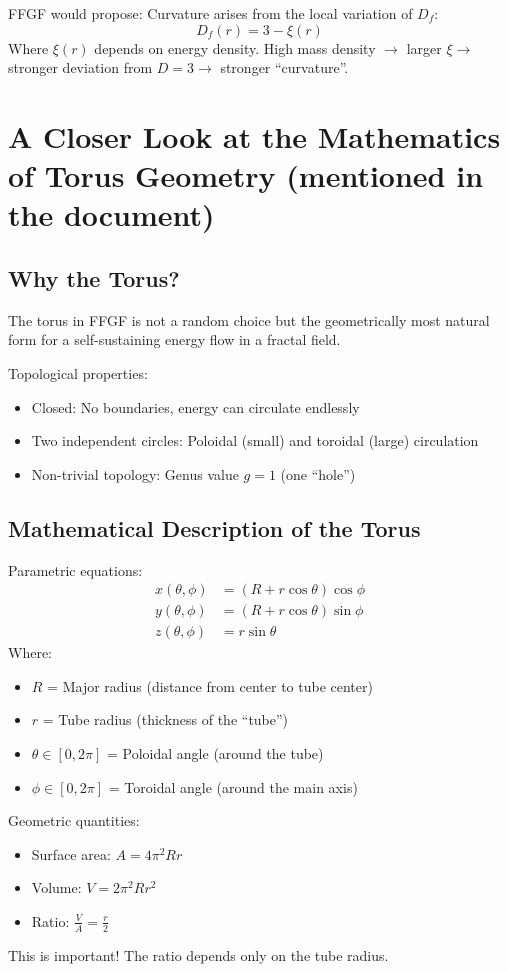 	FFGF would propose: Curvature arises from the local variation of \( D_f \):
	\[
	D_f(r) = 3 - \xi(r)
	\]
	Where \( \xi(r) \) depends on energy density. High mass density \( \rightarrow \) larger \( \xi \rightarrow \) stronger deviation from \( D=3 \rightarrow \) stronger ``curvature''.
	\section{A Closer Look at the Mathematics of Torus Geometry (mentioned in the document)}
\subsection{Why the Torus?}
The torus in FFGF is not a random choice but the geometrically most natural form for a self-sustaining energy flow in a fractal field.

Topological properties:
\begin{itemize}
	\item Closed: No boundaries, energy can circulate endlessly
	\item Two independent circles: Poloidal (small) and toroidal (large) circulation
	\item Non-trivial topology: Genus value \( g = 1 \) (one ``hole'')
\end{itemize}

\subsection{Mathematical Description of the Torus}
Parametric equations:
\begin{align}
	x(\theta, \phi) &= (R + r \cos \theta) \cos \phi \\
	y(\theta, \phi) &= (R + r \cos \theta) \sin \phi \\
	z(\theta, \phi) &= r \sin \theta
\end{align}
Where:
\begin{itemize}
	\item \( R \) = Major radius (distance from center to tube center)
	\item \( r \) = Tube radius (thickness of the ``tube'')
	\item \( \theta \in [0, 2\pi] \) = Poloidal angle (around the tube)
	\item \( \phi \in [0, 2\pi] \) = Toroidal angle (around the main axis)
\end{itemize}

Geometric quantities:
\begin{itemize}
	\item Surface area: \( A = 4\pi^2 R r \)
	\item Volume: \( V = 2\pi^2 R r^2 \)
	\item Ratio: \( \frac{V}{A} = \frac{r}{2} \)
\end{itemize}
This is important! The ratio depends only on the tube radius.

